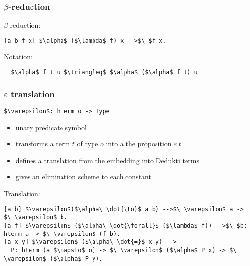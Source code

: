 \begin{frame}[fragile]
\frametitle{$\beta$-reduction}

\begin{block}{$\beta$-reduction:}
\begin{lstlisting}
[a b f x] $\alpha$ ($\lambda$ f) x -->$\ $f x.
\end{lstlisting}
\end{block}

\vspace{0.5cm}

\begin{block}{Notation:}
\begin{lstlisting}
  $\alpha$ f t u $\triangleq$ $\alpha$ ($\alpha$ f t) u
\end{lstlisting}
\end{block}
\end{frame}


\begin{frame}[fragile]
\frametitle{$\varepsilon$ translation}

\lstinline!$\varepsilon$: hterm o -> Type!
\begin{itemize}
\item unary predicate symbol
\item transforms a term $t$ of type $o$ into a the proposition
  $\varepsilon\ t$
\item defines a translation from the embedding into Dedukti terms
\item \alert{gives an elimination scheme to each constant}
\end{itemize}

\vspace{0.5cm}

\begin{block}{Translation:}
\begin{lstlisting}
[a b] $\varepsilon$($\alpha\ \dot{\to}$ a b) -->$\ \varepsilon$ a -> $\ \varepsilon$ b.
[a f] $\varepsilon$ ($\alpha\ \dot{\forall}$ ($\lambda$ f)) -->$\ $b: hterm a -> $\ \varepsilon$ (f b).
[a x y] $\varepsilon$ ($\alpha\ \dot{=}$ x y) -->
  P: hterm (a $\mapsto$ o) -> $\ \varepsilon$ ($\alpha$ P x) -> $\ \varepsilon$ ($\alpha$ P y).
\end{lstlisting}
\end{block}

\end{frame}


